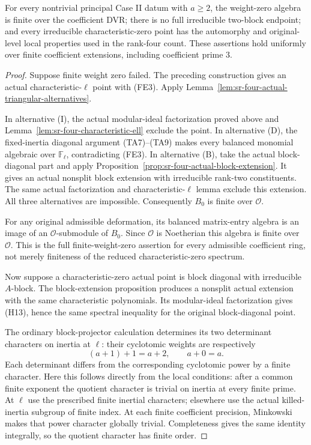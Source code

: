 \begin{srproposition}\label{prop:sr-four-actual-final-endpoint}
For every nontrivial principal Case II datum with \(a\ge2\),
the weight-zero algebra is finite over the coefficient DVR;
there is no full irreducible two-block endpoint; and every
irreducible characteristic-zero point has the automorphy
and original-level local properties used in the rank-four
count.
These assertions hold uniformly over finite coefficient
extensions, including coefficient prime \(3\).
\end{srproposition}
\begin{proof}
Suppose finite weight zero failed.
The preceding construction gives an actual
characteristic-\(\ell\) point with (FE3).
Apply Lemma~\ref{lem:sr-four-actual-triangular-alternatives}.

In alternative (I), the actual modular-ideal factorization
proved above and
Lemma~\ref{lem:sr-four-characteristic-ell} exclude the point.
In alternative (D), the fixed-inertia diagonal argument
(TA7)--(TA9) makes every balanced monomial algebraic over
\(\mathbb F_\ell\), contradicting (FE3).
In alternative (B), take the actual block-diagonal part
and apply Proposition~\ref{prop:sr-four-actual-block-extension}.
It gives an actual nonsplit block extension with irreducible
rank-two constituents. The same actual factorization and
characteristic-\(\ell\) lemma exclude this extension.
All three alternatives are impossible.
Consequently \(B_0\) is finite over \(\mathcal O\).

For any original admissible deformation, its balanced
matrix-entry algebra is an image of an \(\mathcal O\)-submodule
of \(B_0\). Since \(\mathcal O\) is Noetherian this algebra is
finite over \(\mathcal O\).
This is the full finite-weight-zero assertion for every
admissible coefficient ring, not merely finiteness of the
reduced characteristic-zero spectrum.

Now suppose a characteristic-zero actual point is block
diagonal with irreducible \(A\)-block.
The block-extension proposition produces a nonsplit actual
extension with the same characteristic polynomials.
Its modular-ideal factorization gives (H13), hence the
same spectral inequality for the original block-diagonal
point.

The ordinary block-projector calculation determines its
two determinant characters on inertia at \(\ell\):
their cyclotomic weights are respectively
\[
                         (a+1)+1=a+2,\qquad a+0=a.
 \tag{FE4}
\]
Each determinant differs from the corresponding cyclotomic
power by a finite character.
Here this follows directly from the local conditions:
after a common finite exponent the quotient character
is trivial on inertia at every finite prime.
At \(\ell\) use the prescribed finite inertial characters;
elsewhere use the actual killed-inertia subgroup of finite
index. At each finite coefficient precision, Minkowski
makes that power character globally trivial.
Completeness gives the same identity integrally, so the
quotient character has finite order.


\end{proof}
